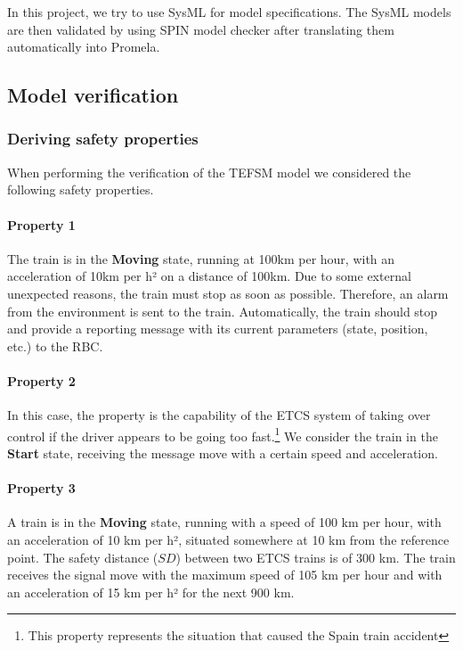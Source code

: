 \documentclass{template/openetcs_article}
\begin{document}
In this project, we try to use SysML for model specifications. The SysML models are then validated by using SPIN model checker after translating them automatically into Promela.

\subsection{Model verification}\label{sec3}


\subsubsection{Deriving safety properties}\label{subsec3.1}


When performing the verification of the TEFSM model we considered the following safety properties.

\paragraph*{Property 1}

The train is in the \textbf{Moving} state, running at 100km per hour, with an acceleration of 10km per h² on a distance of 100km. Due to some external unexpected reasons, the train must stop as soon as possible. Therefore, an alarm from the environment is sent to the train. Automatically, the train should stop and provide a reporting message with its current parameters (state, position, etc.) to the RBC.

\paragraph*{Property 2}

In this case, the property is the capability of the ETCS system of taking over control if the driver appears to be going too fast.\footnote{This property represents the situation that caused the Spain train accident}  We consider the train in the \textbf{Start} state, receiving the message move with a certain speed and acceleration.

\paragraph*{Property 3}

A train is in the \textbf{Moving} state, running with a speed of 100 km per hour, with an acceleration of 10 km per h², situated somewhere at 10 km from the reference point. The safety distance ($SD$) between two ETCS trains is of 300 km. The train receives the signal move with the maximum speed of 105 km per hour and with an acceleration of 15 km per h² for the next 900 km.
\end{document}
